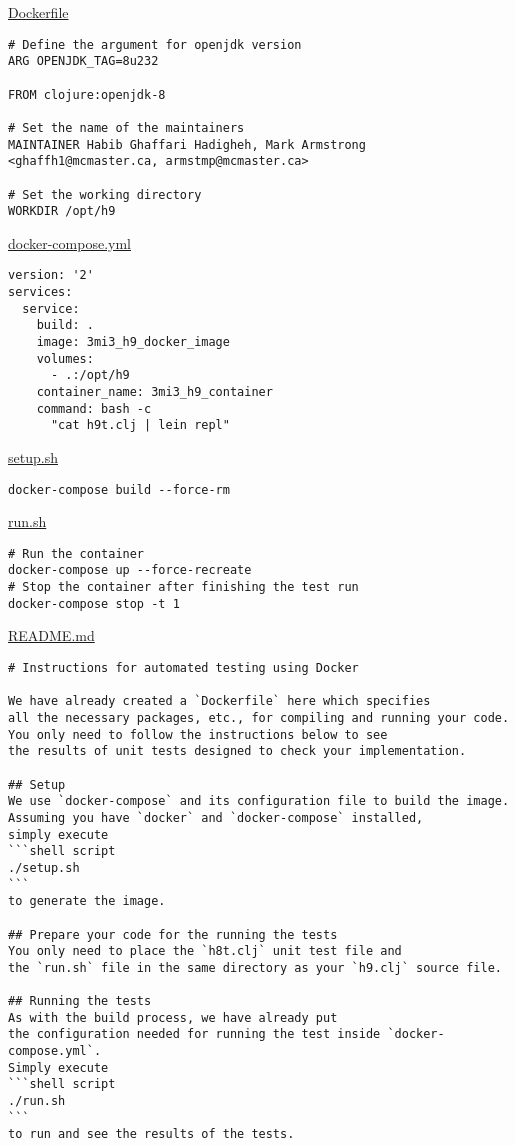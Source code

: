 \documentclass[11pt]{article}
\begin{document}
\href{./testing/h9/Dockerfile}{Dockerfile}
\begin{verbatim}
# Define the argument for openjdk version
ARG OPENJDK_TAG=8u232

FROM clojure:openjdk-8
    
# Set the name of the maintainers
MAINTAINER Habib Ghaffari Hadigheh, Mark Armstrong <ghaffh1@mcmaster.ca, armstmp@mcmaster.ca>

# Set the working directory
WORKDIR /opt/h9
\end{verbatim}

\href{./testing/h9/docker-compose.yml}{docker-compose.yml}
\begin{verbatim}
version: '2'
services:
  service:
    build: .
    image: 3mi3_h9_docker_image
    volumes:
      - .:/opt/h9
    container_name: 3mi3_h9_container
    command: bash -c
      "cat h9t.clj | lein repl"
\end{verbatim}

\href{./testing/h9/setup.sh}{setup.sh}
\begin{verbatim}
docker-compose build --force-rm
\end{verbatim}

\href{./testing/h9/run.sh}{run.sh}
\begin{verbatim}
# Run the container
docker-compose up --force-recreate
# Stop the container after finishing the test run
docker-compose stop -t 1
\end{verbatim}

\href{./testing/h9/README.md}{README.md}
\begin{verbatim}
# Instructions for automated testing using Docker

We have already created a `Dockerfile` here which specifies
all the necessary packages, etc., for compiling and running your code.
You only need to follow the instructions below to see 
the results of unit tests designed to check your implementation.

## Setup
We use `docker-compose` and its configuration file to build the image.
Assuming you have `docker` and `docker-compose` installed,
simply execute
```shell script
./setup.sh
```
to generate the image.

## Prepare your code for the running the tests
You only need to place the `h8t.clj` unit test file and
the `run.sh` file in the same directory as your `h9.clj` source file.

## Running the tests
As with the build process, we have already put
the configuration needed for running the test inside `docker-compose.yml`.
Simply execute
```shell script
./run.sh
```
to run and see the results of the tests.
\end{verbatim}
\end{document}
